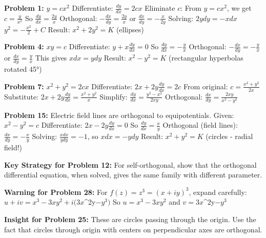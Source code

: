 \documentclass[12pt]{article}
\begin{document}
\textbf{Problem 1:} $y = cx^{2}$
Differentiate: $\frac{dy}{dx} = 2cx$
Eliminate $c$: From $y = cx^{2}$, we get $c = \frac{y}{x^{2}}$
So $\frac{dy}{dx} = \frac{2y}{x}$
Orthogonal: $-\frac{dx}{dy} = \frac{2y}{x}$ or $\frac{dx}{dy} = -\frac{x}{2y}$
Solving: $2y dy = -x dx$
$y^{2} = -\frac{x^{2}}{2} + C$
Result: $x^{2} + 2y^{2} = K$ (ellipses)

\textbf{Problem 4:} $xy = c$
Differentiate: $y + x\frac{dy}{dx} = 0$
So $\frac{dy}{dx} = -\frac{y}{x}$
Orthogonal: $-\frac{dx}{dy} = -\frac{y}{x}$ or $\frac{dx}{dy} = \frac{y}{x}$
This gives $x dx = y dy$
Result: $x^{2} - y^{2} = K$ (rectangular hyperbolas rotated 45°)

\textbf{Problem 7:} $x^{2} + y^{2} = 2cx$
Differentiate: $2x + 2y\frac{dy}{dx} = 2c$
From original: $c = \frac{x^{2} + y^{2}}{2x}$
Substitute: $2x + 2y\frac{dy}{dx} = \frac{x^{2} + y^{2}}{x}$
Simplify: $\frac{dy}{dx} = \frac{y^{2} - x^{2}}{2xy}$
Orthogonal: $\frac{dx}{dy} = \frac{2xy}{x^{2} - y^{2}}$

\textbf{Problem 15:} Electric field lines are orthogonal to equipotentials.
Given: $x^{2} - y^{2} = c$
Differentiate: $2x - 2y\frac{dy}{dx} = 0$
So $\frac{dy}{dx} = \frac{x}{y}$
Orthogonal (field lines): $\frac{dx}{dy} = -\frac{x}{y}$
Solving: $\frac{x dx}{y dy} = -1$, so $x dx = -y dy$
Result: $x^{2} + y^{2} = K$ (circles - radial field!)

\textbf{Key Strategy for Problem 12:} For self-orthogonal, show that the orthogonal differential equation, when solved, gives the same family with different parameter.

\textbf{Warning for Problem 28:} For $f(z) = z^{3} = (x+iy)^{3}$, expand carefully:
$u + iv = x^{3} - 3xy^{2} + i(3x$^{2y}$ - y^{3})$
So $u = x^{3} - 3xy^{2}$ and $v = 3x$^{2y}$ - y^{3}$

\textbf{Insight for Problem 25:} These are circles passing through the origin. Use the fact that circles through origin with centers on perpendicular axes are orthogonal.
\end{document}
